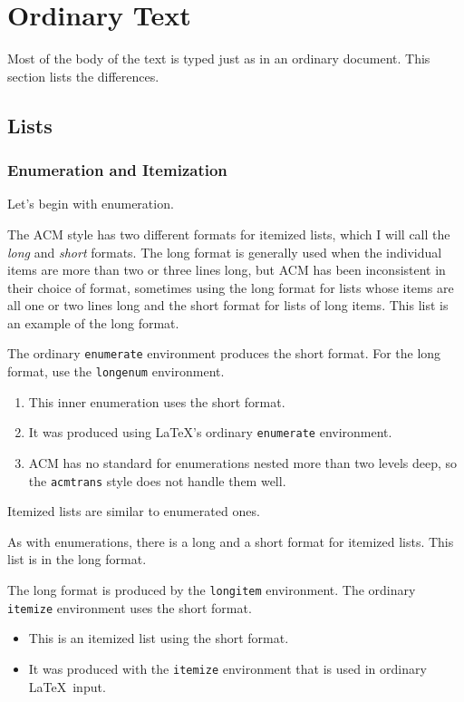 \section{Ordinary Text}

Most of the body of the text is typed just as in an ordinary
document.  This section lists the differences.

\subsection{Lists}

\subsubsection{Enumeration and Itemization}

Let's begin with enumeration.
\begin{longenum}
\item The ACM style has two different formats for 
itemized lists, which I will call the {\em long\/} and {\em short\/}
formats.  The long format is generally used when the individual items
are more than two or three lines long, but ACM has been inconsistent in
their choice of format, sometimes using the long format for lists whose
items are all one or two lines long and the short format for lists of
long items.  This list is an example of the long format.

\item The ordinary {\tt enumerate} environment
produces the short format.  For the long format, use the
{\tt longenum} environment.
\begin{enumerate}
\item This inner enumeration uses the short format.
\item It was produced using \LaTeX's ordinary {\tt enumerate}
      environment.
\item ACM has no standard for enumerations nested more than
      two levels deep, so the {\tt acmtrans} style does not
      handle them well.
\end{enumerate}
\end{longenum}

Itemized lists are similar to enumerated ones.
\begin{longitem}
\item As with enumerations, there is a long and a short
format for itemized lists.  This list is in the long format.

\item The long format is produced by the {\tt longitem}
environment.  The ordinary {\tt itemize} environment
uses the short format.
\begin{itemize}
\item This is an itemized list using the short format.

\item It was produced  with the {\tt itemize} environment
that is used in ordinary \LaTeX\ input.
\end{itemize}
\end{longitem}


